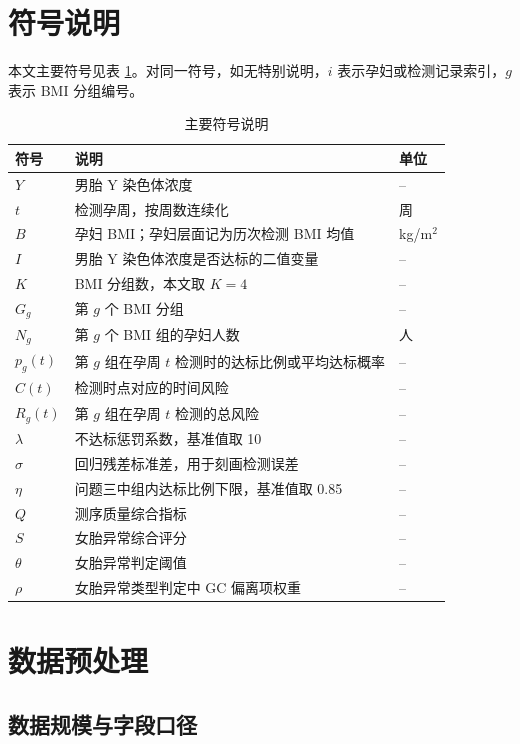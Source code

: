 \documentclass[UTF8,zihao=-4]{ctexart}
\numberwithin{equation}{section}
\begin{document}
\section{符号说明}

本文主要符号见表 \ref{tab:symbols}。对同一符号，如无特别说明，$i$ 表示孕妇或检测记录索引，$g$ 表示 BMI 分组编号。

\begin{table}[H]
\centering
\caption{主要符号说明}
\label{tab:symbols}
\begin{tabular}{>{\centering\arraybackslash}p{2.2cm}p{9.2cm}>{\centering\arraybackslash}p{2cm}}
\toprule
符号 & 说明 & 单位 \\
\midrule
$Y$ & 男胎 Y 染色体浓度 & -- \\
$t$ & 检测孕周，按周数连续化 & 周 \\
$B$ & 孕妇 BMI；孕妇层面记为历次检测 BMI 均值 & kg/m$^2$ \\
$I$ & 男胎 Y 染色体浓度是否达标的二值变量 & -- \\
$K$ & BMI 分组数，本文取 $K=4$ & -- \\
$G_g$ & 第 $g$ 个 BMI 分组 & -- \\
$N_g$ & 第 $g$ 个 BMI 组的孕妇人数 & 人 \\
$p_g(t)$ & 第 $g$ 组在孕周 $t$ 检测时的达标比例或平均达标概率 & -- \\
$C(t)$ & 检测时点对应的时间风险 & -- \\
$R_g(t)$ & 第 $g$ 组在孕周 $t$ 检测的总风险 & -- \\
$\lambda$ & 不达标惩罚系数，基准值取 10 & -- \\
$\sigma$ & 回归残差标准差，用于刻画检测误差 & -- \\
$\eta$ & 问题三中组内达标比例下限，基准值取 0.85 & -- \\
$Q$ & 测序质量综合指标 & -- \\
$S$ & 女胎异常综合评分 & -- \\
$\theta$ & 女胎异常判定阈值 & -- \\
$\rho$ & 女胎异常类型判定中 GC 偏离项权重 & -- \\
\bottomrule
\end{tabular}
\end{table}

\section{数据预处理}

\subsection{数据规模与字段口径}
\end{document}
